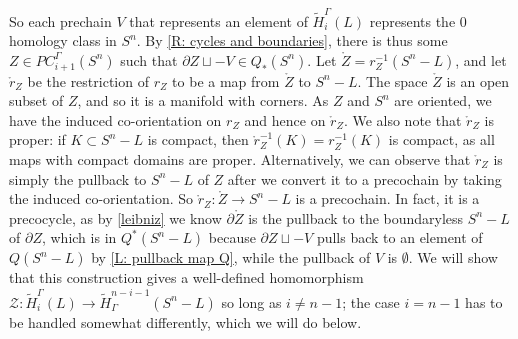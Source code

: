 \documentclass[12pt]{article}
\theoremstyle{plain}
\theoremstyle{definition}
\theoremstyle{remark}
\newcommand{\td}[1]{\tilde{#1}}
\newcommand{\mr}[1]{\mathring{#1}}
\newcommand{\bd}{\partial}
\newcommand{\mc}[1]{\mathcal{#1}}
\begin{document}
So each prechain $V$ that represents an element of $\td H_i^\Gamma(L)$ represents the $0$ homology class in $S^n$. By \cref{R: cycles and boundaries}, there is thus some $Z \in PC^\Gamma_{i+1}(S^n)$ such that $\bd Z \sqcup -V \in Q_*(S^n)$.
Let $\mathring Z = r_Z^{-1}(S^n-L)$, and let $\mathring r_Z$ be the restriction of $r_Z$ to be a map from $\mathring Z$ to $S^n-L$.
The space $\mathring Z$ is an open subset of $Z$, and so it is a manifold with corners.
As $Z$ and $S^n$ are oriented, we have the induced co-orientation on $r_Z$ and hence on $\mathring r_Z$.  We also note that $\mathring r_Z$ is proper: if $K \subset S^n-L$ is compact, then $\mathring r_Z^{-1}(K) = r_Z^{-1}(K)$ is compact, as all maps with compact domains are proper.
Alternatively, we can observe that $\mr r_Z$ is simply the pullback to $S^n-L$ of $Z$ after we convert it to a precochain by taking the induced co-orientation.
So $\mathring r_Z \colon \mathring Z \to S^n - L$ is a precochain.
In fact, it is a precocycle, as by \cref{leibniz} we know $\bd{\mr Z}$ is the pullback to the boundaryless $S^n-L$ of $\bd Z$, which is in $Q^*(S^n-L)$ because $\bd Z \sqcup -V$ pulls back to an element of $Q(S^n-L)$ by \cref{L: pullback map Q}, while the pullback of $V$ is $\emptyset$.
We will show that this construction gives a well-defined homomorphism $\mc Z \colon \td H_i^\Gamma(L) \to \td H^{n-i-1}_\Gamma(S^n-L)$ so long as $i \neq n-1$; the case $i = n-1$ has to be handled somewhat differently, which we will do below.
\end{document}
